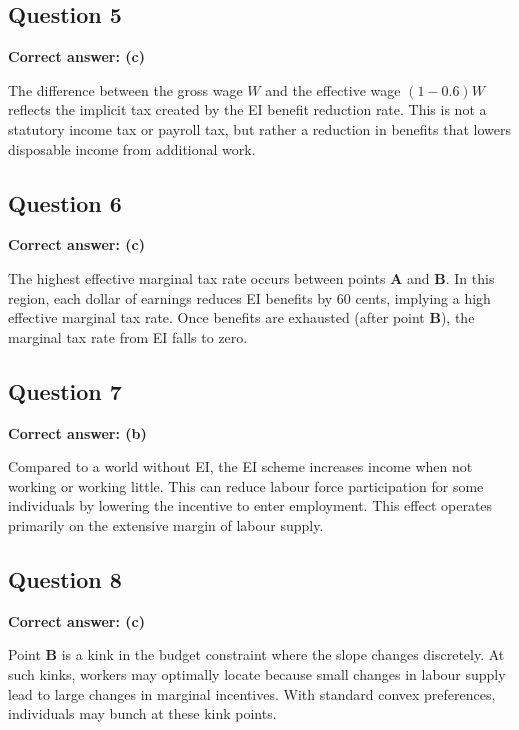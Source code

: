 \documentclass[11pt]{article}
\begin{document}
\subsection*{Question 5}

\textbf{Correct answer: (c)}

The difference between the gross wage \(W\) and the effective wage \( (1-0.6)W \) reflects the implicit tax created by the EI benefit reduction rate.  
This is not a statutory income tax or payroll tax, but rather a reduction in benefits that lowers disposable income from additional work.



\subsection*{Question 6}

\textbf{Correct answer: (c)}

The highest effective marginal tax rate occurs between points \textbf{A} and \textbf{B}.  
In this region, each dollar of earnings reduces EI benefits by 60 cents, implying a high effective marginal tax rate.  
Once benefits are exhausted (after point \textbf{B}), the marginal tax rate from EI falls to zero.



\subsection*{Question 7}

\textbf{Correct answer: (b)}

Compared to a world without EI, the EI scheme increases income when not working or working little.  
This can reduce labour force participation for some individuals by lowering the incentive to enter employment.  
This effect operates primarily on the extensive margin of labour supply.



\subsection*{Question 8}

\textbf{Correct answer: (c)}

Point \textbf{B} is a kink in the budget constraint where the slope changes discretely.  
At such kinks, workers may optimally locate because small changes in labour supply lead to large changes in marginal incentives.  
With standard convex preferences, individuals may bunch at these kink points.
\end{document}
